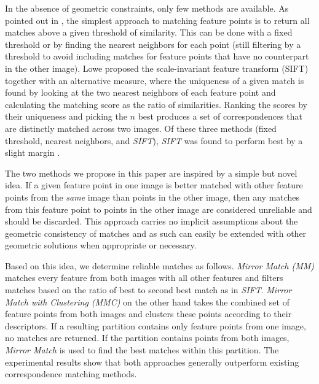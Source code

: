 \documentclass[conference]{IEEEtran}
\begin{document}
In the absence of geometric constraints, only few methods are available. 
As pointed out in \cite{szeliski2010}, the simplest 
approach to matching feature points is to return all matches above a given 
threshold of similarity.  This can be done with a fixed threshold or by 
finding the nearest neighbors for each point (still filtering by a threshold to avoid including matches for feature points that have no counterpart in the other image).  
Lowe \cite{lowe2004sift} proposed the scale-invariant feature transform (SIFT) together with 
an alternative measure, where the uniqueness of a given match is found by 
looking at the two nearest neighbors of each feature point and 
calculating the matching score as the ratio of similarities.  Ranking the 
scores by their uniqueness and picking the $n$ best produces a set of 
correspondences that are distinctly matched across two images. %
Of these three methods (fixed threshold, nearest neighbors, and \emph{SIFT}), 
\emph{SIFT} was found to perform best by a slight margin 
\cite{mikolajczyk2005performance}.

The two methods we propose in this paper are inspired by a simple 
but novel idea. If a given feature point in one image is better matched with other feature points from the 
\emph{same} image than points in the other image, then any matches from 
this feature point to points in the other image are considered unreliable and should be 
discarded.  This approach carries no implicit assumptions about the 
geometric consistency of matches and as such can easily be extended with 
other geometric solutions when appropriate or necessary.

Based on this idea,  we determine reliable matches as 
follows. \emph{Mirror Match (MM)} matches every feature from both 
images with all other features and filters matches based on the ratio of 
best to second best match as in \emph{SIFT}. \emph{Mirror Match with 
Clustering (MMC)} on the other hand takes the combined set of feature 
points from both images and clusters these points according to their 
descriptors.  If a resulting partition contains only feature points from one image, no matches are 
returned.  If the 
partition contains points from both images, \emph{Mirror Match} is used 
to find the best matches within this partition.  The experimental results 
show that both approaches generally outperform existing 
correspondence matching methods.
\end{document}
